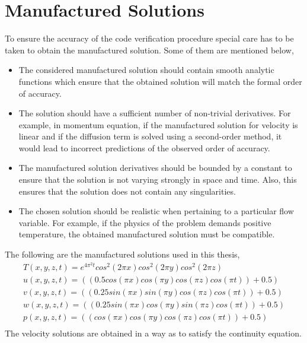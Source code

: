 \section{Manufactured Solutions}
\hspace{0.25cm}To ensure the accuracy of the code verification procedure special care has to be taken to obtain the manufactured solution. Some of them are mentioned below,\\
\begin{itemize}
  \item The considered manufactured solution should contain smooth analytic functions which ensure that the obtained solution will match the formal order of accuracy.
  \item The solution should have a sufficient number of non-trivial derivatives. For example, in momentum equation, if the manufactured solution for velocity is linear and if the diffusion term is solved using a second-order method, it would lead to incorrect predictions of the observed order of accuracy.
  \item The manufactured solution derivatives should be bounded by a constant to ensure that the solution is not varying strongly in space and time. Also, this ensures that the solution does not contain any singularities.
  \item The chosen solution should be realistic when pertaining to a particular flow variable. For example, if the physics of the problem demands positive temperature, the obtained manufactured solution must be compatible.\\
\end{itemize} 
The following are the manufactured solutions used in this thesis,
\begin{equation}\label{eq:44}
\begin{gathered}
    T(x,y,z,t)=e^{4\pi^2t}cos^2(2\pi x)cos^2(2\pi y)cos^2(2\pi z)\\
    u(x,y,z,t)=((0.5cos(\pi x)cos(\pi y)cos(\pi z)cos(\pi t))+0.5)\\
    v(x,y,z,t)=((0.25sin(\pi x)sin(\pi y)cos(\pi z)cos(\pi t))+0.5)\\
    w(x,y,z,t)=((0.25sin(\pi x)cos(\pi y)sin(\pi z)cos(\pi t))+0.5)\\
    p(x,y,z,t)=((cos(\pi x)cos(\pi y)cos(\pi z)cos(\pi t))+0.5)\\
\end{gathered}
\end{equation}
The velocity solutions are obtained in a way as to satisfy the continuity equation. 

